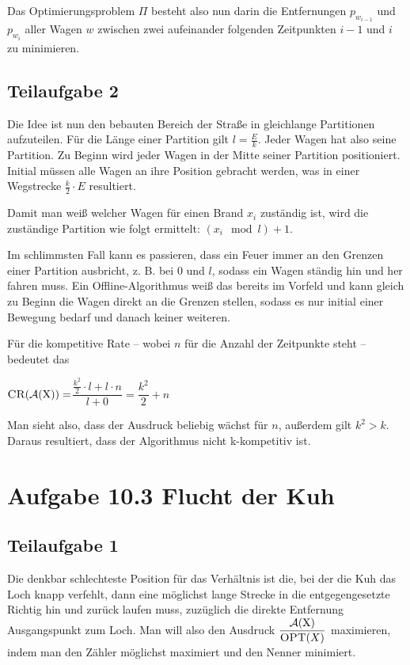 \documentclass[a4paper, fontsize=10pt]{scrartcl}
\begin{document}
Das Optimierungsproblem $\Pi$ besteht also nun darin die Entfernungen $p_{w_{i-1}}$ und $p_{w_{i}}$ aller Wagen $w$ zwischen zwei aufeinander folgenden Zeitpunkten $i-1$ und $i$ zu minimieren. 

\subsection*{Teilaufgabe 2}
Die Idee ist nun den bebauten Bereich der Straße in gleichlange Partitionen aufzuteilen. Für die Länge einer Partition gilt $l=\frac{E}{k}$. Jeder Wagen hat also seine Partition. Zu Beginn wird jeder Wagen in der Mitte seiner Partition positioniert. Initial müssen alle Wagen an ihre Position gebracht werden, was in einer Wegstrecke $\frac{k}{2}\cdot E$ resultiert.\smallskip

Damit man weiß welcher Wagen für einen Brand $x_i$ zuständig ist, wird die zuständige Partition wie folgt ermittelt:
$(x_i\mod l)+1$.\smallskip

Im schlimmsten Fall kann es passieren, dass ein Feuer immer an den Grenzen einer Partition ausbricht, z. B. bei $0$ und $l$, sodass ein Wagen ständig hin und her fahren muss. Ein Offline-Algorithmus weiß das bereits im Vorfeld und kann gleich zu Beginn die Wagen direkt an die Grenzen stellen, sodass es nur initial einer Bewegung bedarf und danach keiner weiteren.\smallskip

Für die kompetitive Rate -- wobei $n$ für die Anzahl der Zeitpunkte steht -- bedeutet das\smallskip

\begin{center}
  $\textsc{CR}(\cal{A}(\textrm{X}))=$$\dfrac{\frac{k^2}{2}\cdot l+l\cdot n}{l + 0}=\dfrac{k^2}{2}+n$
\end{center}

Man sieht also, dass der Ausdruck beliebig wächst für $n$, außerdem gilt $k^2>k$. Daraus resultiert, dass der Algorithmus nicht k-kompetitiv ist. 

\newpage

\section*{Aufgabe 10.3 Flucht der Kuh}

\subsection*{Teilaufgabe 1}

Die denkbar schlechteste Position für das Verhältnis ist die, bei der die Kuh das Loch knapp verfehlt, dann eine möglichst lange Strecke in die entgegengesetzte Richtig hin und zurück laufen muss, zuzüglich die direkte Entfernung Ausgangspunkt zum Loch. Man will also den Ausdruck\smallskip
$\dfrac{ \cal{A}\textrm{(X)}}{\textsc{OPT}(X)}$ maximieren, indem man den Zähler möglichst maximiert und den Nenner minimiert.\bigskip
\end{document}
